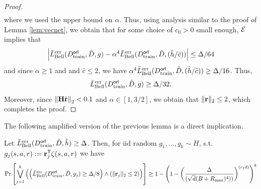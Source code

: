 \begin{proof}
\begin{align}
    \end{align}
    where we used the upper bound on $\alpha$.
    Thus, 
    using analysis similar to the proof of Lemma \ref{lem:vecnet}, we obtain that for some choice of $c_0 > 0$ small enough, $\mathcal{E}$ implies that 
    \begin{equation}
        \left|\tilde{L}^{\textnormal{err}}_{\textnormal{Bell}}(D^{\sf orl}_{\textnormal{train}},  \hat{D}, g) - \alpha^4\tilde{L}^{\textnormal{err}}_{\textnormal{Bell}}(D^{\sf orl}_{\textnormal{train}},  \hat{D},  (\hat{h}/\hat{c}))\right| \leq \Delta/64
    \end{equation}
    and since $\alpha \geq 1$ and and $\hat{c} \leq 2$, we have $\alpha^4\tilde{L}^{\textnormal{err}}_{\textnormal{Bell}}(D^{\sf orl}_{\textnormal{train}},  \hat{D},  (\hat{h}/\hat{c})) \geq \Delta/16$. Thus, 
    \begin{equation}
        \tilde{L}^{\textnormal{err}}_{\textnormal{Bell}}(D^{\sf orl}_{\textnormal{train}},  \hat{D}, g) \geq  \Delta/32.
    \end{equation}
    Moreover, since $\left\|\mathbf{H}\tilde{{\mathbf{r}}}\right\|_2 < 0.1$ and $\alpha \in [1, 3/2]$, we obtain that $\|{\mathbf{r}}\|_2 \leq 2$, which completes the proof.
\end{proof}
The following amplified version of the previous lemma is a direct implication.
\begin{lemma} \label{lem:ampprbbd-orl}
    Let $\tilde{L}^{\textnormal{err}}_{\textnormal{Bell}}(D^{\sf orl}_{\textnormal{train}},  \hat{D}, \hat{h}) \geq \Delta$. Then, for iid random $g_1, \dots, g_k \sim H$, s.t. $g_j(s,a,r) := {\mathbf{r}}_j^{\sf T}\zeta(s,a,r)$ we have
\begin{equation*}
        \displaystyle \Pr\left[\bigvee_{j=1}^k \left(\left(\tilde{L}^{\textnormal{err}}_{\textnormal{Bell}}(D^{\sf orl}_{\textnormal{train}},  \hat{D}, g_j) \geq \Delta/8\right)\wedge\left(\|{\mathbf{r}}_j\|_2 \leq 2\right)\right)\right] \geq 1 - \left(1- \left(\frac{\Delta}{(\sqrt{d}(B + R_{\textnormal{max}})^4))}\right)^{(c_1 d)}\right)^k
        \end{equation*}
\end{lemma}

